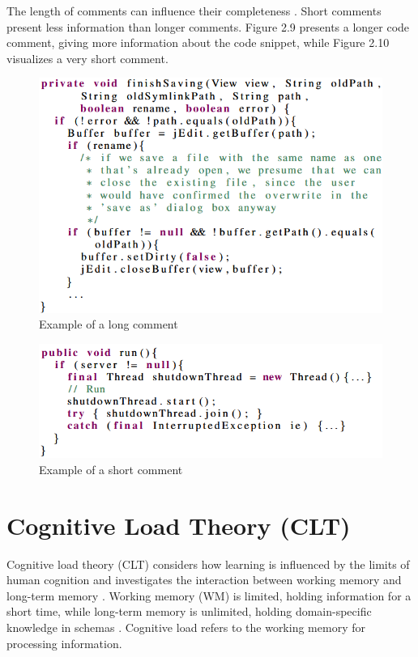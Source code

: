 The length of  comments can influence their completeness \cite{steidl2013quality}. Short comments present less information than longer comments. Figure 2.9 presents a longer code comment, giving more information about the code snippet, while Figure 2.10 visualizes a very short comment.

\begin{figure} [H]
  \centering
  \includegraphics [scale=1]
  {figures/long.png}
  \caption{Example of a long comment
  \cite[p. 6]{steidl2013quality}}
  \label{fig:AnhangsChor}
\end{figure}

\begin{figure} [H]
  \centering
  \includegraphics [scale=0.9]
  {figures/run1.png}
  \caption{Example of a short comment
  \cite[p. 6]{steidl2013quality}}
  \label{fig:AnhangsChor}
\end{figure}





\section{Cognitive Load Theory (CLT)}
Cognitive load theory (CLT) considers how learning is influenced by the limits of human cognition and investigates the interaction between working memory and long-term memory \cite{duran2022cognitive}. Working memory (WM) is limited, holding information for a short time, while long-term memory is unlimited, holding domain-specific knowledge in schemas  \cite{zavgorodniaia2020measuring}.
Cognitive load refers to the working memory for processing information. 

